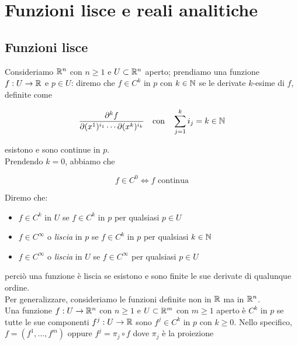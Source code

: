\section{Funzioni lisce e reali analitiche}

\subsection{Funzioni lisce}

Consideriamo $ \mathbb{R}^{n} $ con $ n \geq 1 $ e $ U \subset \mathbb{R}^{n} $ aperto; prendiamo una funzione $ f : U \to \mathbb{R} $ e $ p \in U $: diremo che $ f \in C^{k} $ in $ p $ con $ k \in \mathbb{N} $ se le derivate $ k $-esime di $ f $, definite come

\begin{equation}
	\dfrac{\partial^{k} f}{\partial (x^{1})^{i_{1}} \cdots \partial (x^{k})^{i_{k}}} \qq{con} \sum_{j=1}^{k} i_{j} = k \in \N
\end{equation}

esistono e sono continue in $ p $. \\
Prendendo $ k = 0 $, abbiamo che

\begin{equation}
	f \in C^{0} \iff f \text{ continua}
\end{equation}

Diremo che:

\begin{itemize}
	\item $ f \in C^{k} $ in $ U $ se $ f \in C^{k} $ in $ p $ per qualsiasi $ p \in U $
	
	\item $ f \in C^{\infty} $ o \textit{liscia} in $ p $ se $ f \in C^{k} $ in $ p $ per qualsiasi $ k \in \mathbb{N} $
	
	\item $ f \in C^{\infty} $ o \textit{liscia} in $ U $ se $ f \in C^{\infty} $ per qualsiasi $ p \in U $
\end{itemize}

perciò una funzione è liscia se esistono e sono finite le sue derivate di qualunque ordine. \\
Per generalizzare, consideriamo le funzioni definite non in $ \mathbb{R} $ ma in $ \mathbb{R}^{n} $. \\
Una funzione $ f : U \to \mathbb{R}^{n} $ con $ n \geq 1 $ e $ U \subset \mathbb{R}^{m} $ con $ m \geq 1 $ aperto è $ C^{k} $ in $ p $ se tutte le sue componenti $ f^{j} : U \to \mathbb{R} $ sono $ f^{j} \in C^{k} $ in $ p $ con $ k \geq 0 $. Nello specifico, $ f = (f^{1}, \dots, f^{m}) $ oppure $ f^{j} = \pi_{j} \circ f $ dove $ \pi_{j} $ è la proiezione

